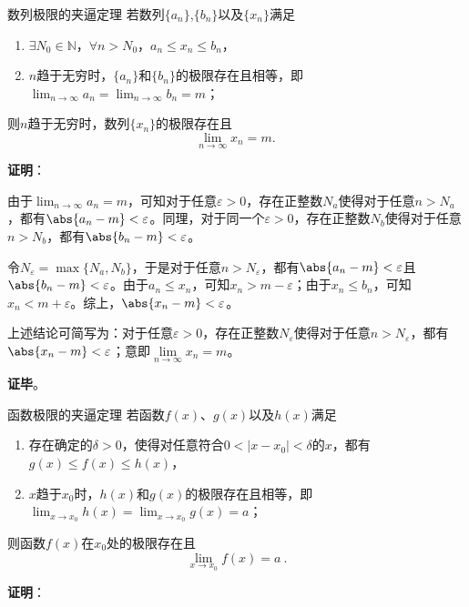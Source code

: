 \begin{theorem}{数列极限的夹逼定理}\label{the_SquzTh_1}
若数列$\{a_n\}$,$\{b_n\}$以及$\{x_n\}$满足
\begin{enumerate}
\item $\exists N_0\in \mathbb{N}$，$\forall n>N_0$，$a_n\leq x_n\leq b_n$，
\item $n$趋于无穷时，$\{a_n\}$和$\{b_n\}$的极限存在且相等，即$\lim_{n\to\infty}a_n=\lim_{n\to\infty}b_n=m$；
\end{enumerate}
则$n$趋于无穷时，数列$\{x_n\}$的极限存在且
\begin{equation}
\lim_{n\to\infty}x_n =m.~
\end{equation}
\end{theorem}

\textbf{证明}：

由于$\lim_{n\to\infty}a_n=m$，可知对于任意$\varepsilon>0$，存在正整数$N_a$使得对于任意$n>N_a$，都有$\abs{a_n-m}<\varepsilon$。同理，对于同一个$\varepsilon>0$，存在正整数$N_b$使得对于任意$n>N_b$，都有$\abs{b_n-m}<\varepsilon$。

令$N_\varepsilon=\max\{N_a, N_b\}$，于是对于任意$n>N_\varepsilon$，都有$\abs{a_n-m}<\varepsilon$且$\abs{b_n-m}<\varepsilon$。由于$a_n\leq x_n$，可知$x_n>m-\varepsilon$；由于$x_n\leq b_n$，可知$x_n<m+\varepsilon$。综上，$\abs{x_n-m}<\varepsilon$。

上述结论可简写为：对于任意$\varepsilon>0$，存在正整数$N_\varepsilon$使得对于任意$n>N_\varepsilon$，都有$\abs{x_n-m}<\varepsilon$；意即$\lim\limits_{n\to\infty}x_n = m$。

\textbf{证毕}。






\begin{theorem}{函数极限的夹逼定理}\label{the_SquzTh_2}
若函数$f(x)$、$g(x)$以及$h(x)$满足
\begin{enumerate}
\item 存在确定的$\delta>0$，使得对任意符合$0<|x-x_0|<\delta$的$x$，都有$g(x)\leq f(x)\leq h(x)$，
\item $x$趋于$x_0$时，$h(x)$和$g(x)$的极限存在且相等，即$\lim _{x\to x_0}h(x)=\lim _{x\to x_0}g(x)=a$；
\end{enumerate}
则函数$f(x)$在$x_0$处的极限存在且
\begin{equation}
\lim _{x\to x_0}f(x)=a~.
\end{equation}
\end{theorem}



\textbf{证明}：

